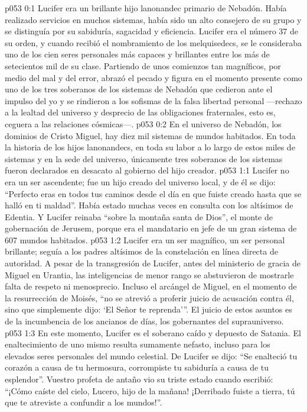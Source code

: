 \author{Manovandet Melquisedec}
\vs p053 0:1 Lucifer era un brillante hijo lanonandec primario de Nebadón. Había realizado servicios en muchos sistemas, había sido un alto consejero de su grupo y se distinguía por su sabiduría, sagacidad y eficiencia. Lucifer era el número 37 de su orden, y cuando recibió el nombramiento de los melquisedecs, se le consideraba uno de los cien seres personales más capaces y brillantes entre los más de setecientos mil de su clase. Partiendo de unos comienzos tan magníficos, por medio del mal y del error, abrazó el pecado y figura en el momento presente como uno de los tres soberanos de los sistemas de Nebadón que cedieron ante el impulso del yo y se rindieron a los sofismas de la falsa libertad personal ---rechazo a la lealtad del universo y desprecio de las obligaciones fraternales, esto es, ceguera a las relaciones cósmicas---.
\vs p053 0:2 En el universo de Nebadón, los dominios de Cristo Miguel, hay diez mil sistemas de mundos habitados. En toda la historia de los hijos lanonandecs, en toda su labor a lo largo de estos miles de sistemas y en la sede del universo, únicamente tres soberanos de los sistemas fueron declarados en desacato al gobierno del hijo creador.
\vs p053 1:1 Lucifer no era un ser ascendente; fue un hijo creado del universo local, y de él se dijo: “Perfecto eras en todos tus caminos desde el día en que fuiste creado hasta que se halló en ti maldad”. Había estado muchas veces en consulta con los altísimos de Edentia. Y Lucifer reinaba “sobre la montaña santa de Dios”, el monte de gobernación de Jerusem, porque era el mandatario en jefe de un gran sistema de 607 mundos habitados.
\vs p053 1:2 Lucifer era un ser magnífico, un ser personal brillante; seguía a los padres altísimos de la constelación en línea directa de autoridad. A pesar de la transgresión de Lucifer, antes del ministerio de gracia de Miguel en Urantia, las inteligencias de menor rango se abstuvieron de mostrarle falta de respeto ni menosprecio. Incluso el arcángel de Miguel, en el momento de la resurrección de Moisés, “no se atrevió a proferir juicio de acusación contra él, sino que simplemente dijo: ‘El Señor te reprenda’”. El juicio de estos asuntos es de la incumbencia de los ancianos de días, los gobernantes del suprauniverso.
\vs p053 1:3 En este momento, Lucifer es el soberano caído y depuesto de Satania. El enaltecimiento de uno mismo resulta sumamente nefasto, incluso para los elevados seres personales del mundo celestial. De Lucifer se dijo: “Se enalteció tu corazón a causa de tu hermosura, corrompiste tu sabiduría a causa de tu esplendor”. Vuestro profeta de antaño vio su triste estado cuando escribió: “¡Cómo caíste del cielo, Lucero, hijo de la mañana! ¡Derribado fuiste a tierra, tú que te atreviste a confundir a los mundos!”.
